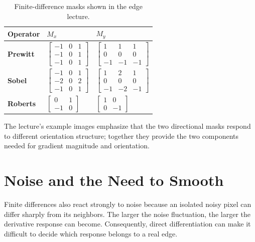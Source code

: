 \documentclass[11pt,a4paper,oneside]{report}
\begin{document}
\begin{table}[!htbp]
\centering
\caption{Finite-difference masks shown in the edge lecture.}
\label{tab:edge-finite-difference}
\small
\begin{tabularx}{\textwidth}{>{\bfseries}l X X}
\toprule
Operator & $M_x$ & $M_y$\\
\midrule
Prewitt & $\begin{bmatrix}-1&0&1\\-1&0&1\\-1&0&1\end{bmatrix}$ & $\begin{bmatrix}1&1&1\\0&0&0\\-1&-1&-1\end{bmatrix}$\\[1.0em]
Sobel & $\begin{bmatrix}-1&0&1\\-2&0&2\\-1&0&1\end{bmatrix}$ & $\begin{bmatrix}1&2&1\\0&0&0\\-1&-2&-1\end{bmatrix}$\\[1.0em]
Roberts & $\begin{bmatrix}0&1\\-1&0\end{bmatrix}$ & $\begin{bmatrix}1&0\\0&-1\end{bmatrix}$\\
\bottomrule
\end{tabularx}
\end{table}

The lecture's example images emphasize that the two directional masks respond to different orientation structure; together they provide the two components needed for gradient magnitude and orientation.

\section{Noise and the Need to Smooth}

Finite differences also react strongly to noise because an isolated noisy pixel can differ sharply from its neighbors. The larger the noise fluctuation, the larger the derivative response can become. Consequently, direct differentiation can make it difficult to decide which response belongs to a real edge.
\end{document}
